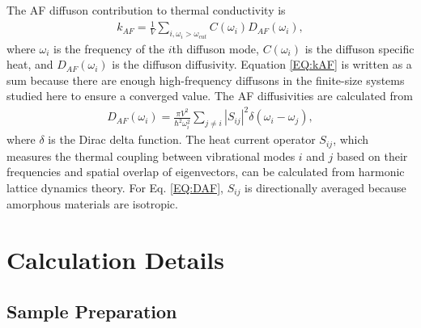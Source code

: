\documentclass[aps,prb,twocolumn,superscriptaddress,footinbib,amsmath,amssymb,floatfix]{revtex4}
\begin{document}
The AF diffuson contribution to thermal conductivity is
\cite{feldman_thermal_1993,feldman_numerical_1999}
\begin{equation}\label{EQ:kAF}
\begin{split}
k_{AF} = \frac{1}{V}\sum_{i,\omega_i>\omega_{cut}} 
C(\omega_i) D_{AF}(\omega_i), 
\end{split}
\end{equation}
where $\omega_i$ is the frequency of the $i$th diffuson mode, 
$C(\omega_i)$ is the diffuson specific heat, and $D_{AF}(\omega_i)$ 
is the diffuson diffusivity. Equation \eqref{EQ:kAF} is written as a 
sum because there are enough high-frequency diffusons in the 
finite-size systems studied here to ensure a converged 
value.  
The AF diffusivities are calculated from\cite{allen_thermal_1993} 
\begin{equation}\label{EQ:DAF}
\begin{split}
D_{AF}(\omega_i) = \frac{\pi V^2}{\hbar^2\omega^2_i}\sum_{j\neq i}
|S_{ij}|^2 \delta(\omega_i - \omega_j),
\end{split}
\end{equation}
where $\delta$ is the Dirac delta 
function.\cite{mfp_fn1} 
The heat current operator $S_{ij}$, which measures the thermal coupling 
between vibrational modes $i$ and $j$ based on their frequencies and 
spatial overlap of eigenvectors, 
can be calculated from harmonic lattice dynamics theory.  
For Eq. \eqref{EQ:DAF}, $S_{ij}$ is directionally averaged because 
amorphous materials are isotropic. 

\section{\label{S:Calculation}Calculation Details}

\subsection{\label{S:Sample}Sample Preparation}
\end{document}
